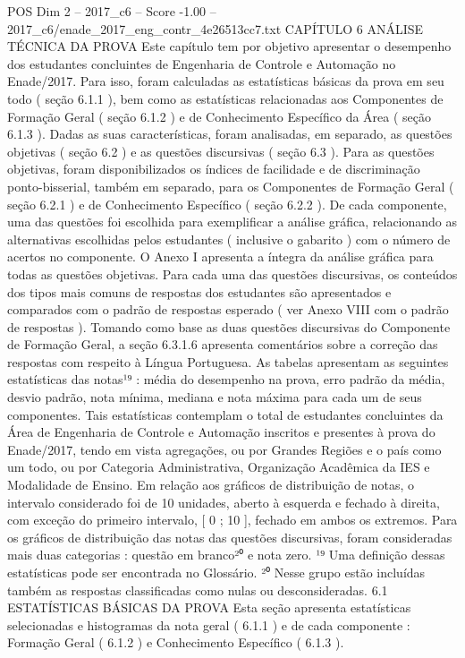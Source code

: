 \begin{textsample}{POS Dim 2 – 2017\_c6 – Score -1.00 – 2017\_c6/enade\_2017\_eng\_contr\_4e26513cc7.txt}  \label{ex:f2_pos_271}
CAPÍTULO 6 ANÁLISE TÉCNICA DA PROVA Este capítulo tem por objetivo apresentar o desempenho dos estudantes concluintes de Engenharia de Controle e Automação no Enade/2017.
Para isso, foram calculadas as estatísticas básicas da prova em seu todo ( seção 6.1.1 ), bem como as estatísticas relacionadas aos Componentes de Formação Geral ( seção 6.1.2 ) e de Conhecimento Específico da Área ( seção 6.1.3 ).
Dadas as suas características, foram analisadas, em separado, as questões objetivas ( seção 6.2 ) e as questões discursivas ( seção 6.3 ).
Para as questões objetivas, foram disponibilizados os índices de facilidade e de discriminação ponto-bisserial, também em separado, para os Componentes de Formação Geral ( seção 6.2.1 ) e de Conhecimento Específico ( seção 6.2.2 ).
De cada componente, uma das questões foi escolhida para exemplificar a análise gráfica, relacionando as alternativas escolhidas pelos estudantes ( inclusive o gabarito ) com o número de acertos no componente.
O Anexo I apresenta a íntegra da análise gráfica para todas as questões objetivas.
Para cada uma das questões discursivas, os conteúdos dos tipos mais comuns de respostas dos estudantes são apresentados e comparados com o padrão de respostas esperado ( ver Anexo VIII com o padrão de respostas ).
Tomando como base as duas questões discursivas do Componente de Formação Geral, a seção 6.3.1.6 apresenta comentários sobre a correção das respostas com respeito à Língua Portuguesa.
As tabelas apresentam as seguintes estatísticas das notas¹⁹ : média do desempenho na prova, erro padrão da média, desvio padrão, nota mínima, mediana e nota máxima para cada um de seus componentes.
Tais estatísticas contemplam o total de estudantes concluintes da Área de Engenharia de Controle e Automação inscritos e presentes à prova do Enade/2017, tendo em vista agregações, ou por Grandes Regiões e o país como um todo, ou por Categoria Administrativa, Organização Acadêmica da IES e Modalidade de Ensino.
Em relação aos gráficos de distribuição de notas, o intervalo considerado foi de 10 unidades, aberto à esquerda e fechado à direita, com exceção do primeiro intervalo, [ 0 ; 10 ], fechado em ambos os extremos.
Para os gráficos de distribuição das notas das questões discursivas, foram consideradas mais duas categorias : questão em branco²⁰ e nota zero. ¹⁹ Uma definição dessas estatísticas pode ser encontrada no Glossário. ²⁰ Nesse grupo estão incluídas também as respostas classificadas como nulas ou desconsideradas. 6.1 ESTATÍSTICAS BÁSICAS DA PROVA Esta seção apresenta estatísticas selecionadas e histogramas da nota geral ( 6.1.1 ) e de cada componente : Formação Geral ( 6.1.2 ) e Conhecimento Específico ( 6.1.3 ).

\end{textsample}
